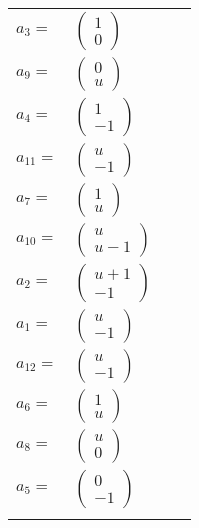 \documentclass[1p]{elsarticle_modified}
\theoremstyle{definition}
\begin{document}
\begin{tabular}{m{7pt} m{180pt} m{7pt} m{180pt} }
\flushright $a_{3}=$&$\begin{pmatrix}1\\0\end{pmatrix}$ \\
\flushright $a_{9}=$&$\begin{pmatrix}0\\u\end{pmatrix}$ \\
\flushright $a_{4}=$&$\begin{pmatrix}1\\-1\end{pmatrix}$ \\
\flushright $a_{11}=$&$\begin{pmatrix}u\\-1\end{pmatrix}$ \\
\flushright $a_{7}=$&$\begin{pmatrix}1\\u\end{pmatrix}$ \\
\flushright $a_{10}=$&$\begin{pmatrix}u\\u-1\end{pmatrix}$ \\
\flushright $a_{2}=$&$\begin{pmatrix}u+1\\-1\end{pmatrix}$ \\
\flushright $a_{1}=$&$\begin{pmatrix}u\\-1\end{pmatrix}$ \\
\flushright $a_{12}=$&$\begin{pmatrix}u\\-1\end{pmatrix}$ \\
\flushright $a_{6}=$&$\begin{pmatrix}1\\u\end{pmatrix}$ \\
\flushright $a_{8}=$&$\begin{pmatrix}u\\0\end{pmatrix}$ \\
\flushright $a_{5}=$&$\begin{pmatrix}0\\-1\end{pmatrix}$\\&\end{tabular}
\end{document}

